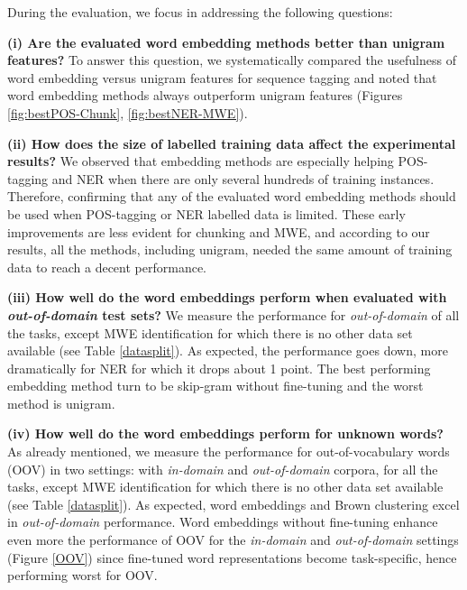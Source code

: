 During the evaluation, we focus in addressing the following questions:

\textbf{(i) Are the evaluated word embedding methods better than unigram features?}
To answer this question, we systematically compared the usefulness of word embedding versus
unigram features for sequence tagging and noted that word embedding methods always outperform 
unigram features (Figures \ref{fig:bestPOS-Chunk}, \ref{fig:bestNER-MWE}). 

\textbf{(ii) How does the size of labelled training data affect the experimental results?}
We observed that embedding methods are especially helping POS-tagging and NER when there are only several hundreds of training instances. 
Therefore, confirming that any of the evaluated word embedding methods should be used when POS-tagging or NER labelled data is limited.
These early improvements are less evident for chunking and MWE, and according to our results, all the methods, including unigram, needed the same amount of training data to reach a decent performance.

\textbf{(iii) How well do the word embeddings perform when evaluated with \textit{out-of-domain} test sets?}
We measure the performance for \textit{out-of-domain} of all the tasks, except MWE identification for which there is no other data set available (see Table \ref{datasplit}).
As expected, the performance goes down, more dramatically for NER for which it drops
about 1 point. The best performing embedding method turn to be skip-gram without fine-tuning and the worst method is unigram.

\textbf{(iv) How well do the word embeddings perform for unknown words?}
As already mentioned, we measure the performance for out-of-vocabulary words (OOV)
in two settings: with \textit{in-domain} and \textit{out-of-domain} corpora, for all the tasks, except MWE identification for which there is no other data set available (see Table \ref{datasplit}).
As expected, word embeddings and Brown clustering excel in \textit{out-of-domain} performance.
Word embeddings without fine-tuning enhance even more the performance of OOV 
for the \textit{in-domain} and \textit{out-of-domain} settings (Figure \ref{OOV}) since fine-tuned
word representations become task-specific, hence performing worst for OOV.


